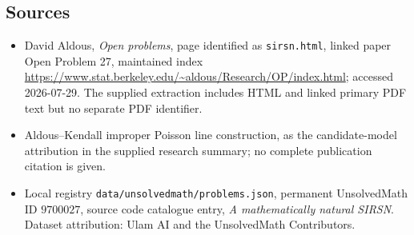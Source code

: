 \documentclass[11pt]{article}
\begin{document}
\subsection{Sources}
\begin{itemize}
\item David Aldous, \emph{Open problems}, page identified as \texttt{sirsn.html}, linked paper Open Problem 27, maintained index \url{https://www.stat.berkeley.edu/~aldous/Research/OP/index.html}; accessed 2026-07-29. The supplied extraction includes HTML and linked primary PDF text but no separate PDF identifier.
\item Aldous--Kendall improper Poisson line construction, as the candidate-model attribution in the supplied research summary; no complete publication citation is given.
\item Local registry \texttt{data/unsolvedmath/problems.json}, permanent UnsolvedMath ID $9700027$, source code catalogue entry, \emph{A mathematically natural SIRSN}. Dataset attribution: Ulam AI and the UnsolvedMath Contributors.
\end{itemize}
\end{document}
